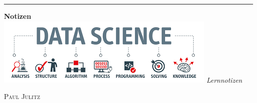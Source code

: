 \begin{titlepage} %

	\raggedleft %
	
	\textcolor{mainone}{\rule{3pt}{\textheight}} %
	\hspace{0.05\textwidth} %
	\parbox[b]{0.75\textwidth}{ %
		
		\parbox[b]{0.57\textwidth}{
		
		\begin{center}
		\vspace{2cm}
		{\Large %
			\bfseries 
			\textcolor{mainthree}{Notizen} \\[1\baselineskip]
		} 
		\includegraphics[width=0.9\linewidth]{attachment/x_titlepage/dsci} 
		{\Large %
			\textit{Lernnotizen}\\
			[4\baselineskip] 
		}
	
		\vspace{4cm}
			{\Large
			\textsc{Paul Julitz}\\ %
		\vspace{0.3\textheight} 
		}\end{center}}
		
	
	}
\end{titlepage}